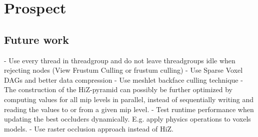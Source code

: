\chapter{Prospect} \label{cpt-prospect}



\section{Future work}

- Use every thread in threadgroup and do not leave threadgroups idle when rejecting nodes (View Frustum Culling or frustum culling)
- Use Sparse Voxel DAGs and better data compression
- Use meshlet backface culling technique
- The construction of the \ac{HiZ}-pyramid can possibly be further optimized by computing values for all mip levels 
  in parallel, instead of sequentially writing and reading the values to or from a given mip level. 
- Test runtime performance when updating the best occluders dynamically. E.g. apply physics operations to voxels models.
- Use raster occlusion approach \cite{NVIDIAGLOC2016} instead of \ac{HiZ}.